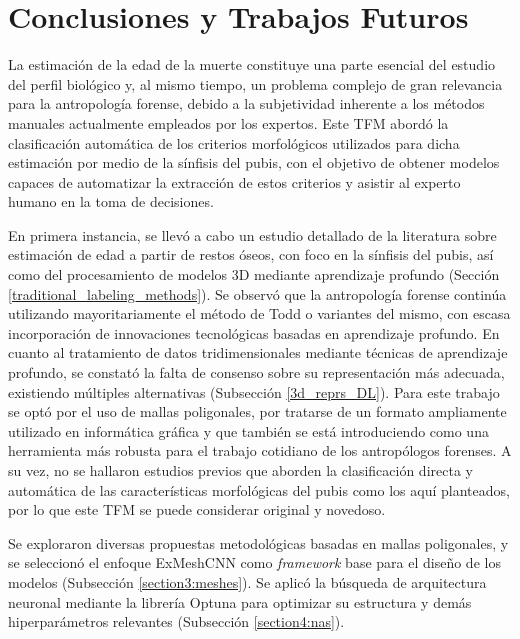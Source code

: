 \chapter{Conclusiones y Trabajos Futuros}

La estimación de la edad de la muerte constituye una parte esencial del estudio del perfil biológico y, al mismo tiempo, un problema complejo de gran relevancia para la antropología forense, debido a la subjetividad inherente a los métodos manuales actualmente empleados por los expertos. Este TFM abordó la clasificación automática de los criterios morfológicos utilizados para dicha estimación por medio de la sínfisis del pubis, con el objetivo de obtener modelos capaces de automatizar la extracción de estos criterios y asistir al experto humano en la toma de decisiones.

En primera instancia, se llevó a cabo un estudio detallado de la literatura sobre estimación de edad a partir de restos óseos, con foco en la sínfisis del pubis, así como del procesamiento de modelos 3D mediante aprendizaje profundo (Sección \ref{traditional_labeling_methods}). Se observó que la antropología forense continúa utilizando mayoritariamente el método de Todd \cite{RefWorks:RefID:19-todd1921age} o variantes del mismo, con escasa incorporación de innovaciones tecnológicas basadas en aprendizaje profundo. En cuanto al tratamiento de datos tridimensionales mediante técnicas de aprendizaje profundo, se constató la falta de consenso sobre su representación más adecuada, existiendo múltiples alternativas (Subsección \ref{3d_reprs_DL}). Para este trabajo se optó por el uso de mallas poligonales, por tratarse de un formato ampliamente utilizado en informática gráfica y que también se está introduciendo como una herramienta más robusta para el trabajo cotidiano de los antropólogos forenses. A su vez, no se hallaron estudios previos que aborden la clasificación directa y automática de las características morfológicas del pubis como los aquí planteados, por lo que este TFM se puede considerar original y novedoso.

Se exploraron diversas propuestas metodológicas basadas en mallas poligonales, y se seleccionó el enfoque ExMeshCNN \cite{kim_exmeshcnn_2022} como \textit{framework} base para el diseño de los modelos (Subsección \ref{section3:meshes}). Se aplicó la búsqueda de arquitectura neuronal mediante la librería Optuna para optimizar su estructura y demás hiperparámetros relevantes (Subsección \ref{section4:nas}).

